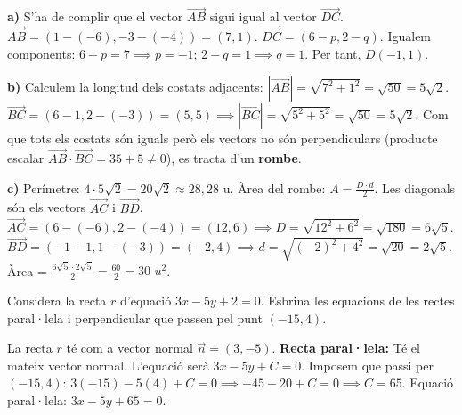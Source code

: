 \documentclass[12pt,a4paper,answers]{exam} %
\begin{document}
\begin{questions}

    \begin{solution}
        \textbf{a)} S'ha de complir que el vector $\vec{AB}$ sigui igual al vector $\vec{DC}$.
        $\vec{AB} = (1 - (-6), -3 - (-4)) = (7, 1)$.
        $\vec{DC} = (6 - p, 2 - q)$.
        Igualem components: $6 - p = 7 \implies p = -1$; $2 - q = 1 \implies q = 1$. Per tant, $D(-1, 1)$.
        
        \textbf{b)} Calculem la longitud dels costats adjacents:
        $|\vec{AB}| = \sqrt{7^2 + 1^2} = \sqrt{50} = 5\sqrt{2}$.
        $\vec{BC} = (6-1, 2-(-3)) = (5, 5) \implies |\vec{BC}| = \sqrt{5^2 + 5^2} = \sqrt{50} = 5\sqrt{2}$.
        Com que tots els costats són iguals però els vectors no són perpendiculars (producte escalar $\vec{AB} \cdot \vec{BC} = 35 + 5 \neq 0$), es tracta d'un \textbf{rombe}.
        
        \textbf{c)} Perímetre: $4 \cdot 5\sqrt{2} = 20\sqrt{2} \approx 28,28$ u.
        Àrea del rombe: $A = \frac{D \cdot d}{2}$. Les diagonals són els vectors $\vec{AC}$ i $\vec{BD}$.
        $\vec{AC} = (6 - (-6), 2 - (-4)) = (12, 6) \implies D = \sqrt{12^2 + 6^2} = \sqrt{180} = 6\sqrt{5}$.
        $\vec{BD} = (-1 - 1, 1 - (-3)) = (-2, 4) \implies d = \sqrt{(-2)^2 + 4^2} = \sqrt{20} = 2\sqrt{5}$.
        Àrea = $\frac{6\sqrt{5} \cdot 2\sqrt{5}}{2} = \frac{60}{2} = 30$ $u^2$.
    \end{solution}

    \question Considera la recta $r$ d'equació $3x-5y+2=0$. Esbrina les equacions de les rectes paral·lela i perpendicular que passen pel punt $(-15, 4)$.

    \begin{solution}
        La recta $r$ té com a vector normal $\vec{n} = (3, -5)$.
        \textbf{Recta paral·lela:} Té el mateix vector normal. L'equació serà $3x - 5y + C = 0$.
        Imposem que passi per $(-15, 4)$: $3(-15) - 5(4) + C = 0 \implies -45 - 20 + C = 0 \implies C = 65$.
        Equació paral·lela: $3x - 5y + 65 = 0$.
        

\end{solution}
\end{questions}
\end{document}
